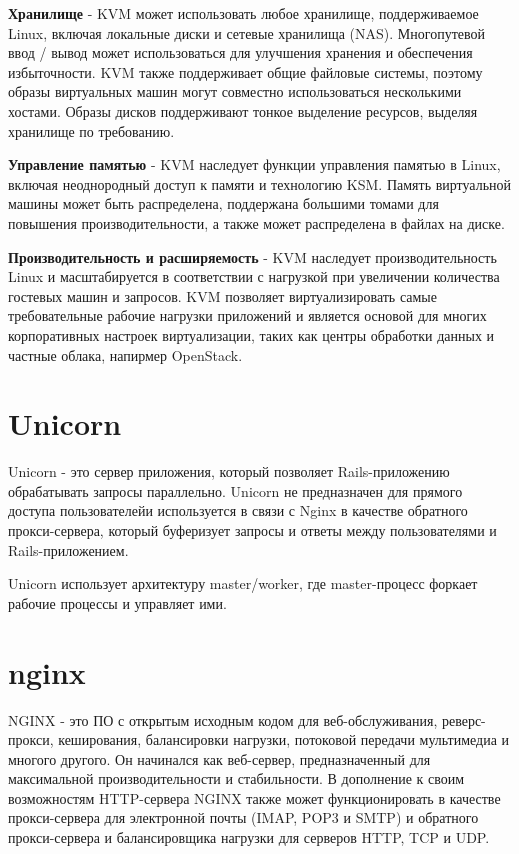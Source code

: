 \textbf{Хранилище} - KVM может использовать любое хранилище, поддерживаемое Linux, включая локальные диски и сетевые хранилища (NAS). Многопутевой ввод / вывод может использоваться для улучшения хранения и обеспечения избыточности. KVM также поддерживает общие файловые системы, поэтому образы виртуальных машин могут совместно использоваться несколькими хостами. Образы дисков поддерживают тонкое выделение ресурсов, выделяя хранилище по требованию.


\textbf{Управление памятью} - KVM наследует функции управления памятью в Linux, включая неоднородный доступ к памяти и технологию KSM. Память виртуальной машины может быть распределена, поддержана большими томами для повышения производительности, а также может распределена в файлах на диске.


\textbf{Производительность и расширяемость} - KVM наследует производительность Linux и масштабируется в соответствии с нагрузкой при увеличении количества гостевых машин и запросов. KVM позволяет виртуализировать самые требовательные рабочие нагрузки приложений и является основой для многих корпоративных настроек виртуализации, таких как центры обработки данных и частные облака, напирмер OpenStack.


\section{Unicorn}\label{sec:ch3/sect8}
Unicorn - это сервер приложения, который позволяет Rails-приложению обрабатывать запросы параллельно. Unicorn не предназначен для прямого доступа пользователейи используется в связи с Nginx в качестве обратного прокси-сервера, который буферизует запросы и ответы между пользователями и Rails-приложением.


Unicorn использует архитектуру master/worker, где master-процесс форкает рабочие процессы и управляет ими.

\section{nginx}\label{sec:ch3/sect9}

NGINX - это ПО с открытым исходным кодом для веб-обслуживания, реверс-прокси, кеширования, балансировки нагрузки, потоковой передачи мультимедиа и многого другого. Он начинался как веб-сервер, предназначенный для максимальной производительности и стабильности. В дополнение к своим возможностям HTTP-сервера NGINX также может функционировать в качестве прокси-сервера для электронной почты (IMAP, POP3 и SMTP) и обратного прокси-сервера и балансировщика нагрузки для серверов HTTP, TCP и UDP.


